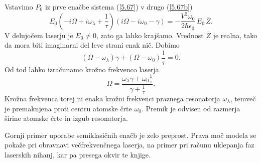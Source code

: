 Vstavimo $P_0$ iz prve enačbe sistema (\ref{5.67}) v drugo (\ref{5.67b})
\begin{equation}  
\label{5.70}
E_0\left(-i\Omega+i\omega_{\lambda}+\frac{1}{\tau}\right) \left(i\Omega- i\omega_0
-\gamma\right)=-\frac{V^2 \omega_0}{2\hbar\epsilon_0}\,E_0\,\overline{Z}.
\end{equation}
V delujočem laserju je $E_0\ne 0$, zato ga lahko krajšamo. Vrednost $\overline{Z}$ je
realna, tako da mora biti imaginarni del leve strani enak nič. Dobimo
\begin{equation}  
\label{5.71}
\left(\Omega- \omega_{\lambda}\right)\gamma+\left(\Omega- \omega_0\right)\frac{1}{\tau} = 0.
\end{equation}
Od tod lahko izračunamo krožno frekvenco laserja 
\begin{equation}  \label{5.72}
\Omega=\frac{\omega_{\lambda}\gamma+ \omega_0\frac{1}{\tau}}{\gamma + \frac{1}{\tau}}.
\end{equation}
Krožna frekvenca torej ni enaka krožni frekvenci praznega resonatorja $\omega_{\lambda}$,
temveč je premaknjena proti centru atomske črte $\omega_0$. Premik je
odvisen od razmerja širine atomske črte in izgub resonatorja.

Gornji primer uporabe semiklasičnih enačb je zelo preprost. Prava moč
modela se pokaže pri obravnavi večfrekvenčnega laserja, na primer pri
računu uklepanja faz laserskih nihanj, kar pa presega okvir te knjige. 
